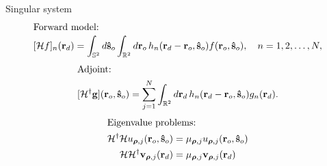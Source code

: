 \documentclass[presentation]{beamer}
\providecommand{\mb}[1]{\mathbf{#1}}
\providecommand{\ro}[1]{\mathbf{\mathbf{r}}_o}
\providecommand{\so}[1]{\mathbf{\hat{s}}_o}
\providecommand{\rd}[1]{\mathbf{r}_d}
\providecommand{\mbb}[1]{\mathbb{#1}}
\providecommand{\bs}[1]{\boldsymbol{#1}}
\begin{document}
\begin{frame}{Singular system}
  \vspace{-2em}
  \begin{align*}
    \intertext{Forward model:}
    [\mathcal{H}f]_n(\rd{}) = \int_{\mbb{S}^2}d\so{}\int_{\mbb{R}^2}d\ro{}\, h_n(\rd{} -\ro{}, \so{})f(\ro{}, \so{}),\quad  n=1, 2,\ldots,N,
    \end{align*}
    \begin{align*}    
    \intertext{Adjoint:}
    [\mathcal{H}^{\dagger}\mb{g}](\ro{}, \so{}) = \sum_{j=1}^N\int_{\mbb{R}^2}d\mb{r}_{d}\, h_n(\rd{} - \ro{}, \so{})g_n(\rd{}).\label{eq:adj}
    \end{align*}
    \begin{align*}
    \intertext{Eigenvalue problems:}
      \mathcal{H}^{\dagger}\mathcal{H}u_{\bs{\rho},j}(\ro{}, \so{}) &= \mu_{\bs{\rho},j}u_{\bs{\rho},j}(\ro{}, \so{})\\
    \mathcal{H}\mathcal{H}^{\dagger}\mb{v}_{\bs{\rho},j}(\rd{}) &= \mu_{\bs{\rho},j}\mb{v}_{\bs{\rho},j}(\rd{})         
  \end{align*}
\end{frame}
\end{document}
